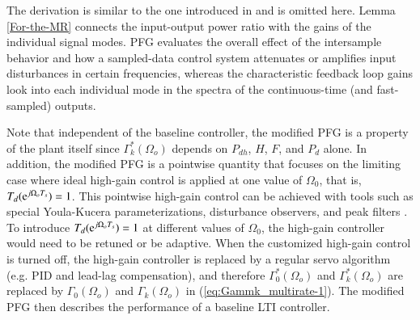 \documentclass [11pt, proquest] {uwthesis}[2020/02/24]
\begin{document}
The derivation is similar to the one introduced in \cite{oomen2007design}
and is omitted here. Lemma \ref{For-the-MR} connects the input-output
power ratio with the gains of the individual signal modes. PFG evaluates
the overall effect of the intersample behavior and how a sampled-data
control system attenuates or amplifies input disturbances in certain
frequencies, whereas the characteristic feedback loop gains look into
each individual mode in the spectra of the continuous-time (and fast-sampled)
outputs. 

Note that independent of the baseline controller, the modified PFG
is a property of the plant itself since $\Gamma_{k}^{*}(\Omega_{o})$
depends on $P_{dh}$, $H$, $F$, and $P_{d}$ alone. In addition,
the modified PFG is a pointwise quantity that focuses on the limiting
case where ideal high-gain control is applied at one value of $\Omega_{0}$,
that is, $T_{d}(\mathrm{e}^{j\Omega_{o}T_{s}})=1$. This pointwise high-gain
control can be achieved with tools such as special Youla-Kucera parameterizations,
disturbance observers, and peak filters \cite{XuChen_TCST2012,Landau_EJC2013_Benchmark_Summary,sievers1992comparison}.
To introduce $T_{d}(\mathrm{e}^{j\Omega_{o}T_{s}})=1$ at different values
of $\Omega_{0}$, the high-gain controller would need to be retuned
or be adaptive. When the customized high-gain control is turned off,
the high-gain controller is replaced by a regular servo algorithm
(e.g. PID and lead-lag compensation), and therefore $\Gamma_{0}^{*}(\Omega_{o})$
and $\Gamma_{k}^{*}(\Omega_{o})$ are replaced by $\Gamma_{0}(\Omega_{o})$
and $\Gamma_{k}(\Omega_{o})$ in (\ref{eq:Gammk_multirate-1}). The
modified PFG then describes the performance of a baseline LTI controller.
\end{document}
